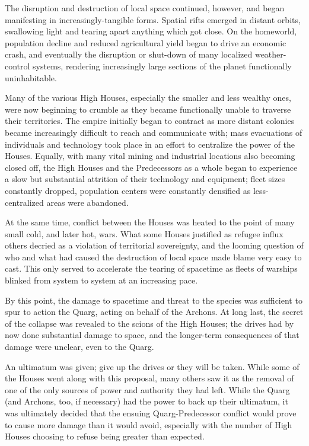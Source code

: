 \documentclass[11pt]{report}
\begin{document}
    The disruption and destruction of local space continued, however, and began manifesting in increasingly-tangible forms. Spatial rifts emerged in distant orbits, swallowing light and tearing apart anything which got close. On the homeworld, population decline and reduced agricultural yield began to drive an economic crash, and eventually the disruption or shut-down of many localized weather-control systems, rendering increasingly large sections of the planet functionally uninhabitable.

    Many of the various High Houses, especially the smaller and less wealthy ones, were now beginning to crumble as they became functionally unable to traverse their territories. The empire initially began to contract as more distant colonies became increasingly difficult to reach and communicate with; mass evacuations of individuals and technology took place in an effort to centralize the power of the Houses. Equally, with many vital mining and industrial locations also becoming closed off, the High Houses and the Predecessors as a whole began to experience a slow but substantial attrition of their technology and equipment; fleet sizes constantly dropped, population centers were constantly densified as less-centralized areas were abandoned.

    At the same time, conflict between the Houses was heated to the point of many small cold, and later hot, wars. What some Houses justified as refugee influx others decried as a violation of territorial sovereignty, and the looming question of who and what had caused the destruction of local space made blame very easy to cast. This only served to accelerate the tearing of spacetime as fleets of warships blinked from system to system at an increasing pace.

    By this point, the damage to spacetime and threat to the species was sufficient to spur to action the Quarg, acting on behalf of the Archons. At long last, the secret of the collapse was revealed to the scions of the High Houses; the drives had by now done substantial damage to space, and the longer-term consequences of that damage were unclear, even to the Quarg. 
    
    An ultimatum was given; give up the drives or they will be taken. While some of the Houses went along with this proposal, many others saw it as the removal of one of the only sources of power and authority they had left. While the Quarg (and Archons, too, if necessary) had the power to back up their ultimatum, it was ultimately decided that the ensuing Quarg-Predecessor conflict would prove to cause more damage than it would avoid, especially with the number of High Houses choosing to refuse being greater than expected.
\end{document}
